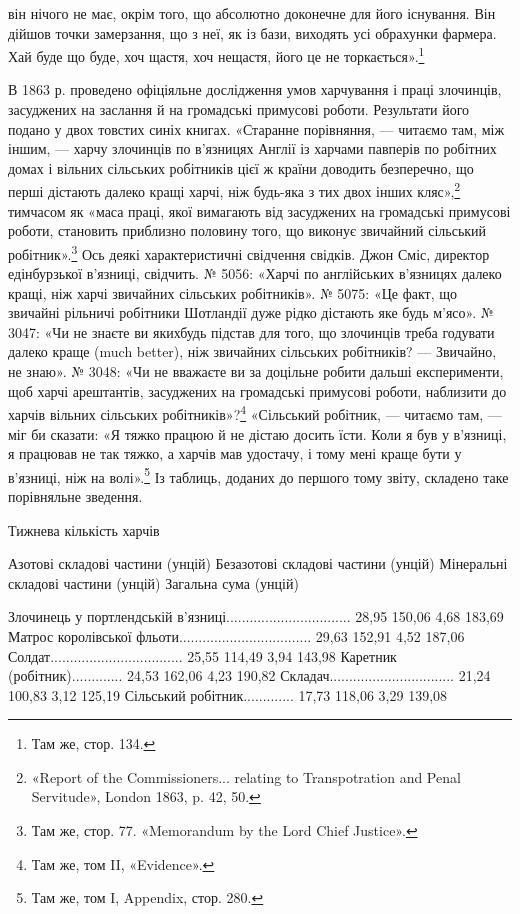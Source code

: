 він нічого не має, окрім того, що абсолютно доконечне для його
існування. Він дійшов точки замерзання, що з неї, як із бази,
виходять усі обрахунки фармера. Хай буде що буде, хоч щастя,
хоч нещастя, його це не торкається».\footnote{
Там же, стор. 134.
}

В 1863 р. проведено офіціяльне дослідження умов харчування
і праці злочинців, засуджених на заслання й на громадські примусові
роботи. Результати його подано у двох товстих синіх
книгах. «Старанне порівняння, — читаємо там, між іншим, —
харчу злочинців по в’язницях Англії із харчами павперів по
робітних домах і вільних сільських робітників цієї ж країни
доводить безперечно, що перші дістають далеко кращі харчі,
ніж будь-яка з тих двох інших кляс»,\footnote{
«Report of the Commissioners... relating to Transpotration and
Penal Servitude», London 1863, p. 42, 50.
} тимчасом як «маса
праці, якої вимагають від засуджених на громадські примусові
роботи, становить приблизно половину того, що виконує звичайний
сільський робітник».\footnote{
Там же, стор. 77. «Memorandum by the Lord Chief Justice».
} Ось деякі характеристичні свідчення
свідків. Джон Сміс, директор едінбурзької в’язниці, свідчить.
№ 5056: «Харчі по англійських в’язницях далеко кращі, ніж
харчі звичайних сільських робітників». № 5075: «Це факт, що
звичайні рільничі робітники Шотландії дуже рідко дістають яке
будь м’ясо». № 3047: «Чи не знаєте ви якихбудь підстав для
того, що злочинців треба годувати далеко краще (much better),
ніж звичайних сільських робітників? — Звичайно, не знаю».
№ 3048: «Чи не вважаєте ви за доцільне робити дальші експерименти,
щоб харчі арештантів, засуджених на громадські примусові
роботи, наблизити до харчів вільних сільських робітників»?\footnote{
Там же, том II, «Evidence».
} «Сільський робітник, — читаємо там, — міг би сказати:
«Я тяжко працюю й не дістаю досить їсти. Коли я був у
в’язниці, я працював не так тяжко, а харчів мав удостачу, і тому
мені краще бути у в’язниці, ніж на волі».\footnote{
Там же, том I, Appendix, стор. 280.
} Із таблиць, доданих
до першого тому звіту, складено таке порівняльне зведення.

Тижнева кількість харчів

Азотові  складові  частини (унцій)
Безазотові  складові  частини (унцій)
Мінеральні  складові  частини (унцій)
Загальна  сума (унцій)

Злочинець у портлендській
в’язниці................................                28,95                150,06               
4,68                  183,69
Матрос королівської
фльоти..................................                29,63                152,91              
4,52                   187,06
Солдат..................................                25,55                114,49               
3,94                   143,98
Каретник (робітник).............                24,53                162,06                4,23     
             190,82
Складач................................                21,24                100,83               
3,12                   125,19
Сільський робітник.............                 17,73                 118,06                3,29    
              139,08